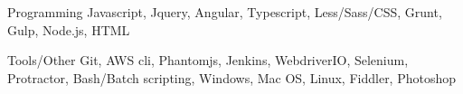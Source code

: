 

\begin{cvskills}

  \cvskill
    {Programming} %
    {Javascript, Jquery, Angular, Typescript, Less/Sass/CSS, Grunt, Gulp, Node.js, HTML} %

  \cvskill
    {Tools/Other} %
    {Git, AWS cli, Phantomjs, Jenkins, WebdriverIO, Selenium, Protractor, Bash/Batch scripting, Windows, Mac OS, Linux, Fiddler, Photoshop} %

\end{cvskills}
